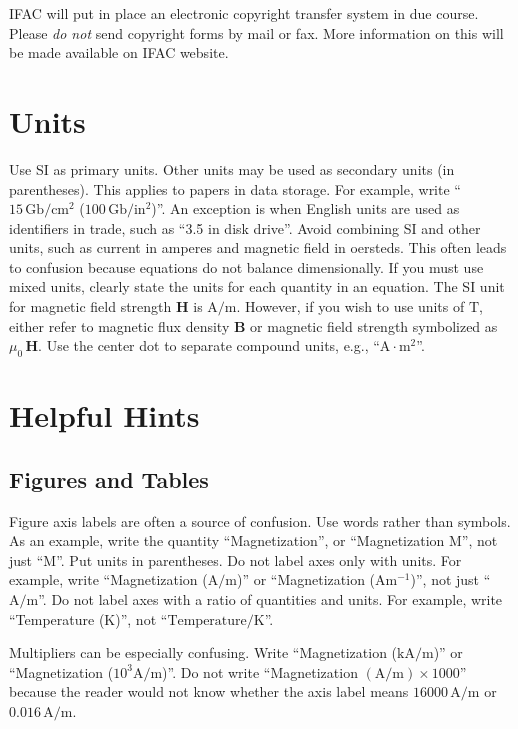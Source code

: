 IFAC will put in place an electronic copyright transfer system in due
course. Please \emph{do not} send copyright forms by mail or fax. More
information on this will be made available on IFAC website.


\section{Units}

Use SI as primary units. Other units may be used as secondary units
(in parentheses). This applies to papers in data storage. For example,
write ``$15\,\mathrm{Gb}/\mathrm{cm}^2$ ($100\,\mathrm{Gb}/\mathrm{in}^2$)''. 
An exception is when
English units are used as identifiers in trade, such as ``3.5 in
disk drive''. Avoid combining SI and other units, such as current in
amperes and magnetic field in oersteds. This often leads to confusion
because equations do not balance dimensionally. If you must use mixed
units, clearly state the units for each quantity in an equation.  The
SI unit for magnetic field strength $\mathbf{H}$ is $\mathrm{A}/\mathrm{m}$. However, if you wish to
use units of $\mathrm{T}$, either refer to magnetic flux density $\mathbf{B}$ or
magnetic field strength symbolized as $\mu_0\,\mathbf{H}$. Use the center dot to
separate compound units, e.g., ``$\mathrm{A} \cdot \mathrm{m}^2$''.

\section{Helpful Hints}

\subsection{Figures and Tables}

Figure axis labels are often a source of confusion. Use words rather
than symbols. As an example, write the quantity ``Magnetization'', or
``Magnetization M'', not just ``M''. Put units in parentheses. Do not
label axes only with units.  For example, write ``Magnetization
($\mathrm{A}/\mathrm{m}$)'' or ``Magnetization ($\mathrm{A} \mathrm{m}^{-1}$)'', not just
 ``$\mathrm{A}/\mathrm{m}$''. Do not
label axes with a ratio of quantities and units. For example, write
``Temperature ($\mathrm{K}$)'', not ``$\mbox{Temperature}/\mathrm{K}$''.

Multipliers can be especially confusing. Write ``Magnetization
($\mathrm{kA}/\mathrm{m}$)'' or ``Magnetization ($10^3 \mathrm{A}/\mathrm{m}$)''. Do not write
``Magnetization $(\mathrm{A}/\mathrm{m}) \times 1000$'' because the reader would not know
whether the axis label means $16000\,\mathrm{A}/\mathrm{m}$ or $0.016\,\mathrm{A}/\mathrm{m}$.

